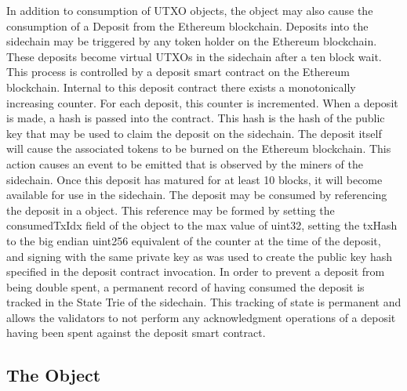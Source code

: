 In addition to consumption of \LayerTwoLong{} UTXO objects, the \TxIn{} object
may also cause the consumption of a Deposit from the Ethereum
blockchain.
Deposits into the sidechain may be triggered by any token holder on the
Ethereum blockchain.
These deposits become virtual UTXOs in the sidechain after a ten block
wait.
This process is controlled by a deposit smart contract on the Ethereum
blockchain.
Internal to this deposit contract there exists a monotonically
increasing counter.
For each deposit, this counter is incremented.
When a deposit is made, a hash is passed into the contract.
This hash is the hash of the public key that may be used to claim the
deposit on the sidechain.
The deposit itself will cause the associated tokens to be burned on the
Ethereum blockchain.
This action causes an event to be emitted that is observed by the
miners of the sidechain.
Once this deposit has matured for at least 10 blocks, it will become
available for use in the sidechain.
The deposit may be consumed by referencing the deposit in a \TxIn{} object.
This reference may be formed by setting the consumedTxIdx field of the
\TxIn{} object to the max value of uint32, setting the txHash to the big
endian uint256 equivalent of the counter at the time of the deposit,
and signing with the same private key as was used to create the public
key hash specified in the deposit contract invocation.
In order to prevent a deposit from being double spent, a permanent
record of having consumed the deposit is tracked in the State Trie of
the sidechain.
This tracking of state is permanent and allows the validators to not
perform any acknowledgment operations of a deposit having been spent
against the deposit smart contract.


\subsection{The \DataStore{} Object}



